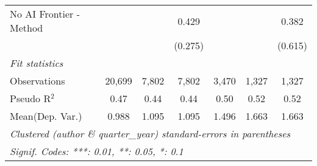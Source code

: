 \begin{tabular}{lcccccc}
   No AI Frontier - Method &               &               & 0.429         &         &               & 0.382\\   
                           &               &               & (0.275)       &         &               & (0.615)\\   
   \midrule
   \emph{Fit statistics}\\
   Observations            & 20,699        & 7,802         & 7,802         & 3,470   & 1,327         & 1,327\\  
   Pseudo R$^2$            & 0.47          & 0.44          & 0.44          & 0.50    & 0.52          & 0.52\\  
Mean(Dep. Var.) & 0.988 & 1.095 & 1.095 & 1.496 & 1.663 & 1.663 \\
   \midrule \midrule
   \multicolumn{7}{l}{\emph{Clustered (author \& quarter\_year) standard-errors in parentheses}}\\
   \multicolumn{7}{l}{\emph{Signif. Codes: ***: 0.01, **: 0.05, *: 0.1}}\\
\end{tabular}
\par\endgroup
